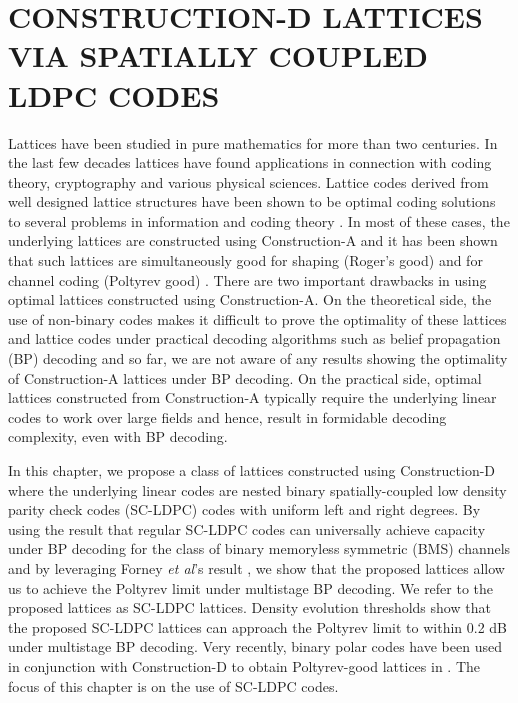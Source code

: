 %
%
%
%
\def \figures_path{./data/SCLDPC}
\chapter{\uppercase {Construction-D Lattices via Spatially coupled LDPC codes}}
\label{chap:SCLDPClattices}

Lattices have been studied in pure mathematics for more than two centuries. In the last few decades lattices have found applications in connection with coding theory, cryptography and various physical sciences. Lattice codes derived from well designed lattice structures have been shown to be optimal coding solutions to several problems in information and coding theory \cite{erez05,zamir2014lattice}. In most of these cases, the underlying lattices are constructed using Construction-A and it has been shown that such lattices are simultaneously good for shaping (Roger's good) and for channel coding (Poltyrev good) \cite{erez05}. There are two important drawbacks in using optimal lattices constructed using Construction-A. On the theoretical side, the use of non-binary codes makes it difficult to prove the optimality of these lattices and lattice codes under practical decoding algorithms such as belief propagation (BP) decoding and so far, we are not aware of any results showing the optimality of Construction-A lattices under BP decoding. On the practical side, optimal lattices constructed from Construction-A typically require the underlying linear codes to work over large fields and hence, result in formidable decoding complexity, even with BP decoding.

In this chapter, we propose a class of lattices constructed using Construction-D \cite{BarnesSloane83} where the underlying linear codes are nested binary spatially-coupled low density parity check codes (SC-LDPC) codes with uniform left and right degrees. By using the result that regular SC-LDPC codes can universally achieve capacity under BP decoding for the class of binary memoryless symmetric (BMS) channels  \cite{kudekaruniversal,kumar2014threshold} and by leveraging Forney {\em et al}'s result \cite{forney2000}, we show that the proposed lattices allow us to achieve the Poltyrev limit under multistage BP decoding. We refer to the proposed lattices as SC-LDPC lattices. Density evolution thresholds show that the proposed SC-LDPC lattices can approach the Poltyrev limit to within 0.2 dB under multistage BP decoding. Very recently, binary polar codes have been used in conjunction with Construction-D to obtain Poltyrev-good lattices in \cite{YanLingWu13}. The focus of this chapter is on the use of SC-LDPC codes.

